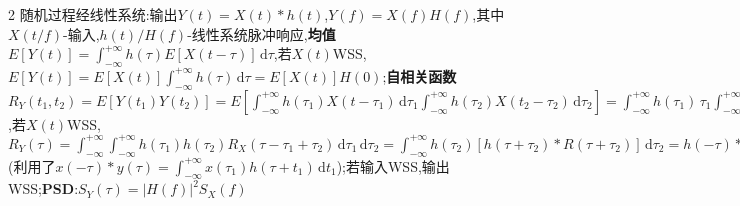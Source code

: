 \documentclass[UTF8,a4paper,10pt]{article}
\providecommand{\abs}[1]{\left\lvert#1\right\rvert}
\begin{document}
\begin{multicols}{2}
    随机过程经线性系统:输出$Y(t)=X(t)*h(t)$,$Y(f)=X(f)H(f)$,其中$X(t/f)$-输入,$h(t)/H(f)$-线性系统脉冲响应,\textbf{均值}$E[Y(t)]=\int_{-\infty}^{+\infty}h(\tau)E[X(t-\tau)]\,\mathrm{d}\tau$,若$X(t)$WSS,$E[Y(t)]=E[X(t)]\int_{-\infty}^{+\infty}h(\tau)\,\mathrm{d}\tau=E[X(t)]H(0)$;\textbf{自相关函数}$R_Y(t_1,t_2)=E[Y(t_1)Y(t_2)]=E[\int_{-\infty}^{+\infty}h(\tau_1)X(t-\tau_1)\,\mathrm{d}\tau_1\int_{-\infty}^{+\infty}h(\tau_2)X(t_2-\tau_2)\,\mathrm{d}\tau_2]=\int_{-\infty}^{+\infty}h(\tau_1)\,\tau_1\int_{-\infty}^{+\infty}h(\tau_2)E[X(t-\tau_1)X(t-\tau_2)]\,\mathrm{d}\tau_2$,若$X(t)$WSS,$R_Y(\tau)=\int_{-\infty}^{+\infty}\int_{-\infty}^{+\infty}h(\tau_1)h(\tau_2)R_X(\tau-\tau_1+\tau_2)\,\mathrm{d}\tau_1\,\mathrm{d}\tau_2=\int_{-\infty}^{+\infty}h(\tau_2)[h(\tau+\tau_2)*R(\tau+\tau_2)]\,\mathrm{d}\tau_2=h(-\tau)*h(\tau)*R_X(\tau)$(利用了$x(-\tau)*y(\tau)=\int_{-\infty}^{+\infty}x(\tau_1)h(\tau+t_1)\,\mathrm{d}t_1$);若输入WSS,输出WSS;\textbf{PSD}:$S_Y(\tau)=\abs{H(f)}^2S_X(f)$
\end{multicols}
\end{document}
